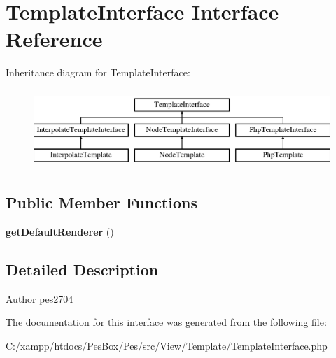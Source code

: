 \hypertarget{interface_pes_1_1_view_1_1_template_1_1_template_interface}{}\section{Template\+Interface Interface Reference}
\label{interface_pes_1_1_view_1_1_template_1_1_template_interface}
Inheritance diagram for Template\+Interface\+:\begin{figure}[H]
\begin{center}
\leavevmode
\includegraphics[height=3.000000cm]{interface_pes_1_1_view_1_1_template_1_1_template_interface}
\end{center}
\end{figure}
\subsection*{Public Member Functions}
\begin{DoxyCompactItemize}
\item 
\mbox{\label{interface_pes_1_1_view_1_1_template_1_1_template_interface_a5f55a7569860e76380abf2728abc56d5}} 
{\bfseries get\+Default\+Renderer} ()
\end{DoxyCompactItemize}


\subsection{Detailed Description}
\begin{DoxyAuthor}{Author}
pes2704 
\end{DoxyAuthor}


The documentation for this interface was generated from the following file\+:\begin{DoxyCompactItemize}
\item 
C\+:/xampp/htdocs/\+Pes\+Box/\+Pes/src/\+View/\+Template/Template\+Interface.\+php\end{DoxyCompactItemize}
